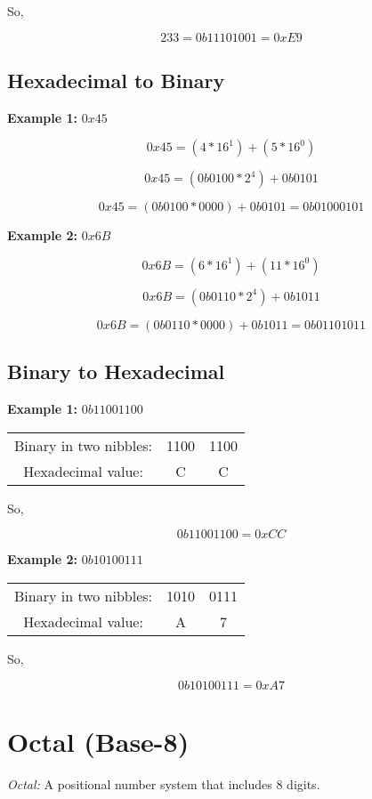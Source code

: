 \documentclass{article}
\begin{document}
So,

\[
233 = 0b1110 1001 = 0xE9
\]

\subsection*{Hexadecimal to Binary}
\textbf{Example 1:} $0x45$

\[
0x45 = (4 * 16^1) + (5 * 16^0)
\]

\[
0x45 = (0b0100 * 2^4) + 0b0101
\]

\[
0x45 = (0b0100 * 0000) + 0b0101 = 0b0100 0101 
\]

\noindent \textbf{Example 2:} $0x6B$

\[
0x6B = (6 * 16^1) + (11 * 16^0)
\]

\[
0x6B = (0b0110 * 2^4) + 0b1011
\]

\[
0x6B = (0b0110 * 0000) + 0b1011 = 0b0110 1011
\]

\subsection*{Binary to Hexadecimal}
\textbf{Example 1:} $0b1100 1100$

\begin{center}
\begin{tabular}{c c c}
Binary in two nibbles: & 1100 & 1100 \\
Hexadecimal value: & C & C \\
\end{tabular}
\end{center}

So,

\[
0b11001100 = 0xCC
\]

\noindent \textbf{Example 2:} $0b1010 0111$

\begin{center}
\begin{tabular}{c c c}
Binary in two nibbles: & 1010 & 0111 \\
Hexadecimal value: & A & 7 \\
\end{tabular}
\end{center} 

So,

\[
0b1010 0111 = 0xA7
\]

\section{Octal (Base-8)}
\textit{Octal:} A positional number system that includes 8 digits. \\
\end{document}
